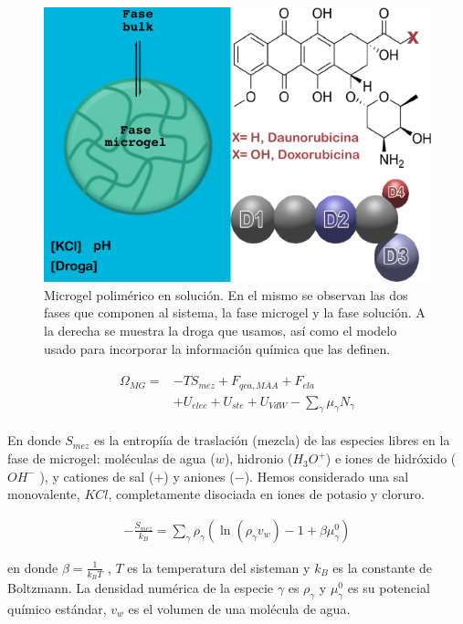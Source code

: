 \begin{figure}[!ht]
	\centering
	\includegraphics[width=0.65\linewidth]{Figures/graph-gel/gel_model.pdf}
	\caption{Microgel polim\'erico en soluci\'on. En el mismo se observan las dos fases que componen al sistema, la fase microgel y la fase soluci\'on. A la derecha se muestra la droga que usamos, as\'i como el modelo usado para incorporar la informaci\'on qu\'imica que las definen.}
	\label{fig:gel:model_gel}
\end{figure}




%
\begin{align}
    \begin{aligned}
       \Omega_{MG}=& -TS_{mez} + F_{qca,MAA} +  F_{ela}\\
       & + U_{elec}+  U_{ste} + U_{VdW} -{\sum_{\gamma}
        {\mu_\gamma N_\gamma}}
    \end{aligned}
    \label{eq:gel:free-energy-implicit}
\end{align}
%

\noindent En donde $S_{mez}$ es la entropí\'ia de traslaci\'on (mezcla) de las especies libres en la fase de microgel: mol\'eculas de agua ($w$), hidronio ($H_3O^+$) e iones de hidr\'oxido ($OH^-$ ), y cationes de sal ($+$) y aniones ($-$).
Hemos considerado una sal monovalente, $KCl$,  completamente disociada en iones de potasio y cloruro.

\begin{align}
-\frac{S_{mez}}{k_B}	= \sum_{\gamma} \rho_\gamma\left(\ln\left(\rho_\gamma v_w\right) -1 + \beta\mu^0_\gamma\right) 
\end{align}

\noindent en donde  $\beta=\frac{1}{k_BT}$ , $T$ es la temperatura del sisteman y  $k_B$ es la constante de Boltzmann.
La densidad num\'erica de la especie $\gamma$ es $\rho_\gamma$ y $\mu^0_\gamma$ es su potencial qu\'imico est\'andar,  $v_w$ es el volumen de una mol\'ecula de agua.

